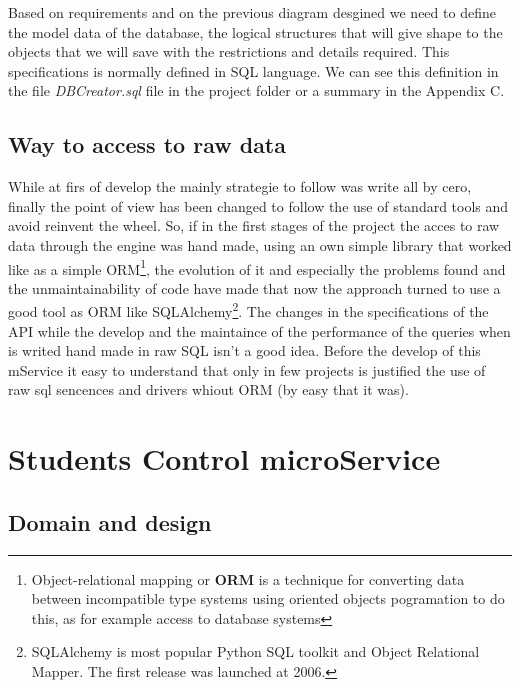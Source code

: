Based on requirements and on the previous diagram desgined we need to define the
model data of the database, the logical structures that will give shape to the
objects that we will save with the restrictions and details required.
This specifications is normally defined in SQL language.
We can see this definition in the file \textit{DBCreator.sql} file in the project
folder or a summary in the Appendix C.

\subsection{Way to access to raw data}

While at firs of develop the mainly strategie to follow was write
all by cero, finally the point of view has been changed to follow
the use of standard tools and avoid reinvent the wheel.
\intro
So, if in the first stages of the project the acces to raw data through
the engine was hand made, using an own simple library that worked
like as a simple ORM\footnote{Object-relational mapping or \textbf{ORM} is a
technique for converting data between incompatible
type systems using oriented objects pogramation to do this, as for example access
to database systems}, the evolution of it and especially the problems
found and the unmaintainability of code have made that now the approach
turned to use a good tool as ORM like SQLAlchemy\footnote{SQLAlchemy is
most popular Python SQL toolkit and Object Relational Mapper. The first
release was launched at 2006.}.
\intro
The changes in the specifications of the API while the develop and
the maintaince of the performance of the queries when is writed hand
made in raw SQL isn't a good idea. Before the develop of this mService
it easy to understand that only in few projects is justified the use
of raw sql sencences and drivers whiout ORM (by easy that it was).


\section{Students Control microService}

\subsection{Domain and design}

